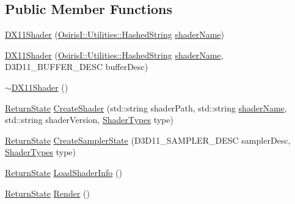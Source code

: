\subsection*{Public Member Functions}
\begin{DoxyCompactItemize}
\item 
\hyperlink{class_osiris_i_1_1_graphics_1_1_shader_1_1_d_x11_shader_a09a3944bb1772c201f55f2455f8134a0}{D\-X11\-Shader} (\hyperlink{class_osiris_i_1_1_utilities_1_1_hashed_string}{Osiris\-I\-::\-Utilities\-::\-Hashed\-String} \hyperlink{class_osiris_i_1_1_graphics_1_1_shader_1_1_i_shader_a0f2d4323ae9304e517f9649831ad7231}{shader\-Name})
\item 
\hyperlink{class_osiris_i_1_1_graphics_1_1_shader_1_1_d_x11_shader_af599a882f497d197b16237000dae0807}{D\-X11\-Shader} (\hyperlink{class_osiris_i_1_1_utilities_1_1_hashed_string}{Osiris\-I\-::\-Utilities\-::\-Hashed\-String} \hyperlink{class_osiris_i_1_1_graphics_1_1_shader_1_1_i_shader_a0f2d4323ae9304e517f9649831ad7231}{shader\-Name}, D3\-D11\-\_\-\-B\-U\-F\-F\-E\-R\-\_\-\-D\-E\-S\-C buffer\-Desc)
\item 
\hyperlink{class_osiris_i_1_1_graphics_1_1_shader_1_1_d_x11_shader_a2c6a1b9a153ef4a311bd356856a1c5e5}{$\sim$\-D\-X11\-Shader} ()
\item 
\hyperlink{namespace_osiris_i_a8f53bf938dc75c65c6a529694514013e}{Return\-State} \hyperlink{class_osiris_i_1_1_graphics_1_1_shader_1_1_d_x11_shader_a4406375fb159b1c72effdf576579832f}{Create\-Shader} (std\-::string shader\-Path, std\-::string \hyperlink{class_osiris_i_1_1_graphics_1_1_shader_1_1_i_shader_a0f2d4323ae9304e517f9649831ad7231}{shader\-Name}, std\-::string shader\-Version, \hyperlink{namespace_osiris_i_1_1_graphics_1_1_shader_a337cc6333eff5c701288da2fb4fd9cec}{Shader\-Types} type)
\item 
\hyperlink{namespace_osiris_i_a8f53bf938dc75c65c6a529694514013e}{Return\-State} \hyperlink{class_osiris_i_1_1_graphics_1_1_shader_1_1_d_x11_shader_a0db3403db2d274b4e65d90f5a6f05546}{Create\-Sampler\-State} (D3\-D11\-\_\-\-S\-A\-M\-P\-L\-E\-R\-\_\-\-D\-E\-S\-C sampler\-Desc, \hyperlink{namespace_osiris_i_1_1_graphics_1_1_shader_a337cc6333eff5c701288da2fb4fd9cec}{Shader\-Types} type)
\item 
\hyperlink{namespace_osiris_i_a8f53bf938dc75c65c6a529694514013e}{Return\-State} \hyperlink{class_osiris_i_1_1_graphics_1_1_shader_1_1_d_x11_shader_a3c25648f860ea801a8c6e8459594eb64}{Load\-Shader\-Info} ()
\item 
\hyperlink{namespace_osiris_i_a8f53bf938dc75c65c6a529694514013e}{Return\-State} \hyperlink{class_osiris_i_1_1_graphics_1_1_shader_1_1_d_x11_shader_ac3bbdbf4839ecca8b1cdf7be312a047e}{Render} ()

\end{DoxyCompactItemize}
